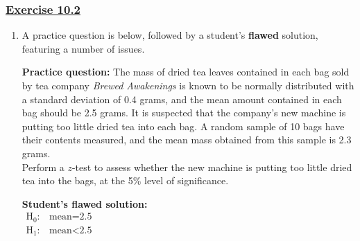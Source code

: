 \documentclass[
  11pt,
]{book}
\begin{document}
\pagebreak

\label{ex102q}{}

\subsubsection*{\texorpdfstring{\hyperref[ex102a]{Exercise 10.2}}{Exercise 10.2}}\label{exercise-10.2}

\begin{enumerate}
    \item A practice question is below, followed by a student's \textbf{flawed} solution, featuring a number of issues.
    \begin{tcolorbox}[colback=white,colframe=black!50]
\textbf{Practice question:} The mass of dried tea leaves contained in each bag sold by tea company \textit{Brewed Awakenings} is known to be normally distributed with a standard deviation of 0.4 grams, and the mean amount contained in each bag should be 2.5 grams. It is suspected that the company's new machine is putting too little dried tea into each bag. A random sample of 10 bags have their contents measured, and the mean mass obtained from this sample is 2.3 grams.\\[0.5em] Perform a $z$-test to assess whether the new machine is putting too little dried tea into the bags, at the 5\% level of significance.

\tcblower
\textbf{Student's flawed solution:}\\

\begin{math}
\begin{array}{ll}
      \text{H}_\text{0}: & \text{mean}=\text{2.5}\\
      \text{H}_\text{1}: & \text{mean}< \text{2.5}
    \end{array}
\end{math}\\


\end{tcolorbox}
\end{enumerate}
\end{document}
